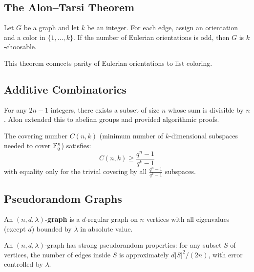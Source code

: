 \subsection{The Alon--Tarsi Theorem}

\begin{theorem}
Let $G$ be a graph and let $k$ be an integer. For each edge, assign an orientation and a color in $\{1, \ldots, k\}$. If the number of Eulerian orientations is odd, then $G$ is $k$-choosable.
\end{theorem}

This theorem connects parity of Eulerian orientations to list coloring.

\subsection{Additive Combinatorics}

\begin{theorem}
For any $2n-1$ integers, there exists a subset of size $n$ whose sum is divisible by $n$. Alon extended this to abelian groups and provided algorithmic proofs.
\end{theorem}

\begin{theorem}
The covering number $C(n,k)$ (minimum number of $k$-dimensional subspaces needed to cover $\mathbb{F}_q^n$) satisfies:
\[
C(n,k) \geq \frac{q^n - 1}{q^k - 1}
\]
with equality only for the trivial covering by all $\frac{q^n-1}{q^k-1}$ subspaces.
\end{theorem}

\subsection{Pseudorandom Graphs}

\begin{definition}
An \textbf{$(n,d,\lambda)$-graph} is a $d$-regular graph on $n$ vertices with all eigenvalues (except $d$) bounded by $\lambda$ in absolute value.
\end{definition}

\begin{theorem}[Alon, 1986]
An $(n,d,\lambda)$-graph has strong pseudorandom properties: for any subset $S$ of vertices, the number of edges inside $S$ is approximately $d|S|^2/(2n)$, with error controlled by $\lambda$.
\end{theorem}

